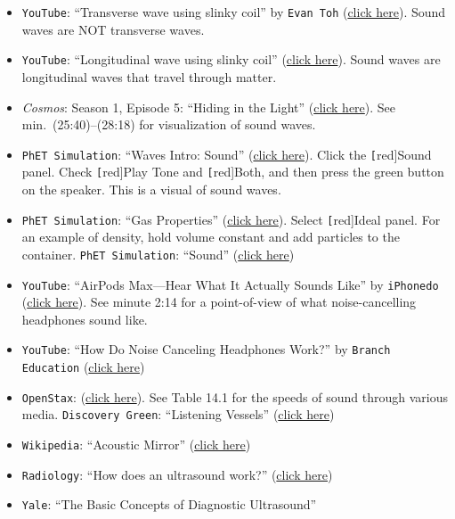 \documentclass[main.tex]{subfiles}
\begin{document}
\begin{itemize}
    \item \texttt{YouTube}: ``Transverse wave using slinky coil'' by \texttt{Evan Toh} (\href{https://youtu.be/g8GcMn7K0u4}{click here}). Sound waves are NOT transverse waves.
    \item \texttt{YouTube}: ``Longitudinal wave using slinky coil'' (\href{https://youtu.be/fMJrtheQfZw}{click here}). Sound waves are longitudinal waves that travel through matter.
    \item \textit{Cosmos}: Season 1, Episode 5: ``Hiding in the Light'' (\href{https://www.amazon.com/Cosmos-Spacetime-Odyssey-Season-1/dp/B00IHCHOGQ}{click here}). See min.~(25:40)--(28:18) for visualization of sound waves.
    \item \texttt{PhET Simulation}:  ``Waves Intro: Sound'' (\href{https://phet.colorado.edu/sims/html/waves-intro/latest/waves-intro_en.html}{click here}). Click the \texttt[red]{Sound} panel. Check \texttt[red]{Play Tone} and \texttt[red]{Both}, and then press the green button on the speaker. This is a visual of sound waves.
    \item \texttt{PhET Simulation}: ``Gas Properties'' (\href{https://phet.colorado.edu/sims/html/gas-properties/latest/gas-properties_en.html}{click here}). Select \texttt[red]{Ideal} panel. For an example of density, hold volume constant and add particles to the container.
    \texttt{PhET Simulation}: ``Sound'' (\href{https://phet.colorado.edu/en/simulations/sound}{click here})
    \item \texttt{YouTube}: ``AirPods Max---Hear What It Actually Sounds Like'' by \texttt{iPhonedo} (\href{https://youtu.be/97gTzS9VFxo?t=134}{click here}). See minute 2:14 for a point-of-view of what noise-cancelling headphones sound like.
    \item \texttt{YouTube}: ``How Do Noise Canceling Headphones Work?'' by \texttt{Branch Education} (\href{https://youtu.be/VIi04uD8LtY}{click here})
    \item \texttt{OpenStax}: (\href{https://openstax.org/books/physics/pages/14-1-speed-of-sound-frequency-and-wavelength#Table_14_01}{click here}). See Table 14.1 for the speeds of sound through various media. 
    \texttt{Discovery Green}: ``Listening Vessels'' (\href{https://www.discoverygreen.com/listening-vessels}{click here})
    \item \texttt{Wikipedia}: ``Acoustic Mirror'' (\href{https://en.wikipedia.org/wiki/Acoustic_mirror}{click here})
    \item \texttt{Radiology}: ``How does an ultrasound work?'' (\href{https://www.radiology.ca/article/how-does-ultrasound-work#}{click here})
    \item \texttt{Yale}: ``The Basic Concepts of Diagnostic Ultrasound''
\end{itemize}
\end{document}
